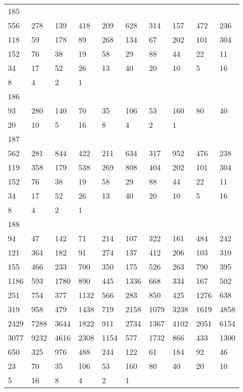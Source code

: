 \begin{longtable}{*{10}{l}}
185&&&&&&&&&\\
556& 278& 139& 418& 209& 628& 314& 157& 472& 236\\
118& 59& 178& 89& 268& 134& 67& 202& 101& 304\\
152& 76& 38& 19& 58& 29& 88& 44& 22& 11\\
34& 17& 52& 26& 13& 40& 20& 10& 5& 16\\
8& 4& 2& 1& \\

186&&&&&&&&&\\
93& 280& 140& 70& 35& 106& 53& 160& 80& 40\\
20& 10& 5& 16& 8& 4& 2& 1& \\

187&&&&&&&&&\\
562& 281& 844& 422& 211& 634& 317& 952& 476& 238\\
119& 358& 179& 538& 269& 808& 404& 202& 101& 304\\
152& 76& 38& 19& 58& 29& 88& 44& 22& 11\\
34& 17& 52& 26& 13& 40& 20& 10& 5& 16\\
8& 4& 2& 1& \\

188&&&&&&&&&\\
94& 47& 142& 71& 214& 107& 322& 161& 484& 242\\
121& 364& 182& 91& 274& 137& 412& 206& 103& 310\\
155& 466& 233& 700& 350& 175& 526& 263& 790& 395\\
1186& 593& 1780& 890& 445& 1336& 668& 334& 167& 502\\
251& 754& 377& 1132& 566& 283& 850& 425& 1276& 638\\
319& 958& 479& 1438& 719& 2158& 1079& 3238& 1619& 4858\\
2429& 7288& 3644& 1822& 911& 2734& 1367& 4102& 2051& 6154\\
3077& 9232& 4616& 2308& 1154& 577& 1732& 866& 433& 1300\\
650& 325& 976& 488& 244& 122& 61& 184& 92& 46\\
23& 70& 35& 106& 53& 160& 80& 40& 20& 10\\
5& 16& 8& 4& 2& 1& \\


\end{longtable}

